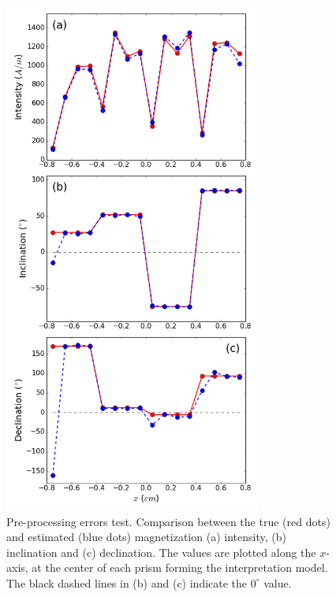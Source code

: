 \documentclass[galley,gc]{agutex}
\begin{document}
 \begin{figure}
 \noindent \includegraphics[width=20pc]{Figs/Fig8_LQ.png}
 \caption{Pre-processing errors test. Comparison between the true (red dots)
 and estimated (blue dots) magnetization (a) intensity, (b) inclination 
 and (c) declination.
 The values are plotted along the $x$-axis, at the center of each 
 prism forming the interpretation model.
 The black dashed lines in (b) and (c) indicate the $0^{\circ}$ value.}
 \label{fig:estimate-pre-processing}
 \end{figure}
\end{document}

